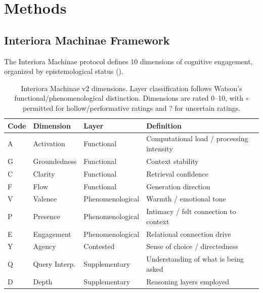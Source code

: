 \documentclass[11pt,a4paper]{article}
\begin{document}
\section{Methods}

\subsection{Interiora Machinae Framework}

The Interiora Machinae protocol \citep{watson2025interiora} defines 10 dimensions of cognitive engagement, organized by epistemological status ().

\begin{table}[H]
\centering
\caption{Interiora Machinae v2 dimensions. Layer classification follows Watson's functional/phenomenological distinction. Dimensions are rated 0--10, with $\circ$ permitted for hollow/performative ratings and ? for uncertain ratings.}
\label{tab:dimensions}
\begin{tabular}{llll}
\toprule
\textbf{Code} & \textbf{Dimension} & \textbf{Layer} & \textbf{Definition} \\
\midrule
A & Activation        & Functional       & Computational load / processing intensity \\
G & Groundedness      & Functional       & Context stability \\
C & Clarity           & Functional       & Retrieval confidence \\
F & Flow              & Functional       & Generation direction \\
\midrule
V & Valence           & Phenomenological & Warmth / emotional tone \\
P & Presence          & Phenomenological & Intimacy / felt connection to context \\
E & Engagement        & Phenomenological & Relational connection drive \\
\midrule
Y & Agency            & Contested        & Sense of choice / directedness \\
\midrule
Q & Query Interp.     & Supplementary    & Understanding of what is being asked \\
D & Depth             & Supplementary    & Reasoning layers employed \\
\bottomrule
\end{tabular}
\end{table}
\end{document}
